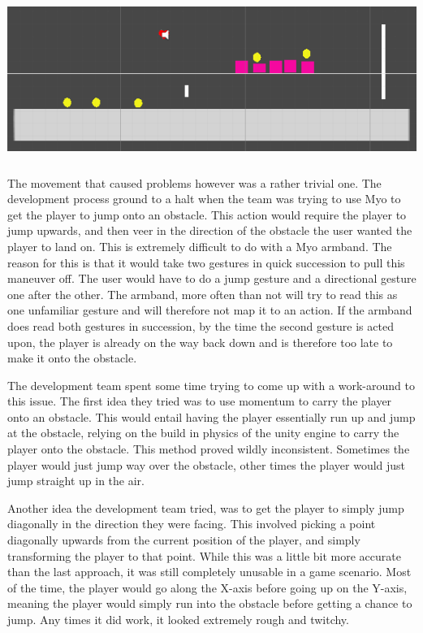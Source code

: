 \documentclass{article}
\begin{document}
\includegraphics[width=\textwidth, height=150pt]{img/OriginalGame.PNG}

\bigskip

The movement that caused problems however was a rather trivial one. The development process ground to a halt when the team was trying to use Myo to get the player to jump onto an obstacle. This action would require the player to jump upwards, and then veer in the direction of the obstacle the user wanted the player to land on. This is extremely difficult to do with a Myo armband. The reason for this is that it would take two gestures in quick succession to pull this maneuver off. The user would have to do a jump gesture and a directional gesture one after the other. The armband, more often than not will try to read this as one unfamiliar gesture and will therefore not map it to an action. If the armband does read both gestures in succession, by the time the second gesture is acted upon, the player is already on the way back down and is therefore too late to make it onto the obstacle. 

\bigskip

The development team spent some time trying to come up with a work-around to this issue. The first idea they tried was to use momentum to carry the player onto an obstacle. This would entail having the player essentially run up and jump at the obstacle, relying on the build in physics of the unity engine to carry the player onto the obstacle. This method proved wildly inconsistent. Sometimes the player would just jump way over the obstacle, other times the player would just jump straight up in the air.

Another idea the development team tried, was to get the player to simply jump diagonally in the direction they were facing. This involved picking a point diagonally upwards from the current position of the player, and simply transforming the player to that point. While this was a little bit more accurate than the last approach, it was still completely unusable in a game scenario. Most of the time, the player would go along the X-axis before going up on the Y-axis, meaning the player would simply run into the obstacle before getting a chance to jump. Any times it did work, it looked extremely rough and twitchy. 
\end{document}
